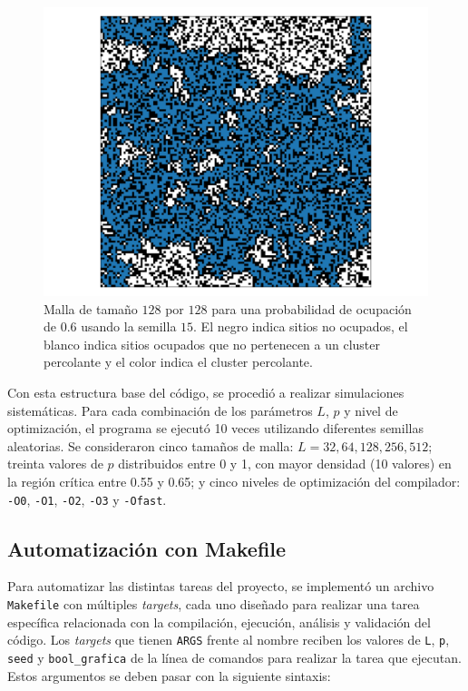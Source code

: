 \documentclass[%
 reprint,
 amsmath,amssymb,
 aps,
]{revtex4-2}
\begin{document}
\begin{figure}[H]
    \centering
    \includegraphics[width=1\linewidth]{malla.pdf}
    \caption{Malla de tamaño $128$ por $128$ para una probabilidad de ocupación de $0.6$ usando la semilla $15$. El negro indica sitios no ocupados, el blanco indica sitios ocupados que no pertenecen a un cluster percolante y el color indica el cluster percolante.}
    \label{fig:cluster}
\end{figure}

Con esta estructura base del código, se procedió a realizar simulaciones sistemáticas. Para cada combinación de los parámetros \( L \), \( p \) y nivel de optimización, el programa se ejecutó 10 veces utilizando diferentes semillas aleatorias. Se consideraron cinco tamaños de malla: \( L = 32, 64, 128, 256, 512 \); treinta valores de \( p \) distribuidos entre 0 y 1, con mayor densidad (10 valores) en la región crítica entre 0.55 y 0.65; y cinco niveles de optimización del compilador: \texttt{-O0}, \texttt{-O1}, \texttt{-O2}, \texttt{-O3} y \texttt{-Ofast}.

\subsection{Automatización con Makefile}

Para automatizar las distintas tareas del proyecto, se implementó un archivo \texttt{Makefile} con múltiples \textit{targets}, cada uno diseñado para realizar una tarea específica relacionada con la compilación, ejecución, análisis y validación del código. Los \textit{targets} que tienen \texttt{ARGS} frente al nombre reciben los valores de \texttt{L}, \texttt{p}, \texttt{seed} y \texttt{bool\_grafica} de la línea de comandos para realizar la tarea que ejecutan. Estos argumentos se deben pasar con la siguiente sintaxis:
\end{document}
